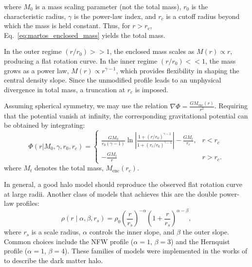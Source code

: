         where $M_0$ is a mass scaling parameter (not the total mass), $r_0$ is the characteristic radius, $\gamma$ is the power-law index, and $r_c$ is a cutoff radius beyond which the mass is held constant. Thus, for $r > r_c$, Eq.~\ref{eq:martos_enclosed_mass} yields the total mass. 

        In the outer regime $(r/r_0) >> 1$, the enclosed mass scales as $M(r) \propto r$, producing a flat rotation curve. In the inner regime $(r/r_0) << 1$, the mass grows as a power law, $M(r) \propto r^{\gamma - 1}$, which provides flexibility in shaping the central density slope. Since the unmodified profile leads to an unphysical divergence in total mass, a truncation at $r_c$ is imposed.

        Assuming spherical symmetry, we may use the relation $\nabla \Phi = \frac{G M_{\mathrm{enc}}(r)}{r^2}$. Requiring that the potential vanish at infinity, the corresponding gravitational potential can be obtained by integrating:
        \begin{equation}
            \Phi(r|M_0,\gamma,r_0,r_c) = 
            \begin{cases}
                \frac{GM_0}{r_0\left(\gamma-1\right)}\ln\left|\frac{1+(r/r_0)^{\gamma-1}}{1+(r_c/r_0)^{\gamma-1}}\right| -\frac{GM_t}{r_c}, & r<r_c\\
                -\frac{GM_t}{r} & r>r_c.
            \end{cases}
        \end{equation}
        where $M_t$ denotes the total mass, $M_{\mathrm{enc}}(r_c)$.

        In general, a good halo model should reproduce the observed flat rotation curve at large radii. Another class of models that achieves this are the double power-law profiles:
        \begin{equation}
            \rho(r \mid \alpha, \beta, r_s) = \rho_0 \left( \frac{r}{r_s} \right)^{-\alpha} \left(1 + \frac{r}{r_s} \right)^{\alpha - \beta},
        \end{equation}
        where $r_s$ is a scale radius, $\alpha$ controls the inner slope, and $\beta$ the outer slope. Common choices include the NFW profile ($\alpha = 1$, $\beta = 3$) and the Hernquist profile ($\alpha = 1$, $\beta = 4$). These families of models were implemented in the works of \citet{2015ApJS..216...29B, 2017MNRAS.465...76M} to describe the dark matter halo.

